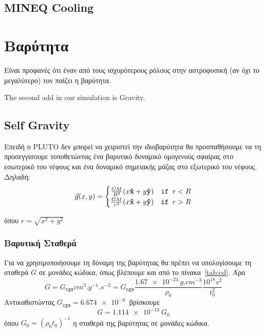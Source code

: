 \documentclass[article,a4paper,11.2pt]{memoir}
\numberwithin{equation}{subsection}
\begin{document}
	\subsection{MINEQ Cooling}
	
	\newpage
	\section{Βαρύτητα}
	Είναι προφανές ότι έναν από τους ισχυρότερους ρόλους στην αστροφυσική (αν όχι το μεγαλύτερο) τον παίζει η βαρύτητα. 
	
	
	
	
	The second add in our simulation is Gravity. 
	\subsection{Self Gravity}
	\label{par:SolidSphereSelfGravit}
	Επειδή ο PLUTO δεν μπορεί να χειριστεί την ιδιοβαρύτητα θα προσπαθήσουμε να τη προσεγγίσουμε τοποθετώντας ένα βαρυτικό δυναμικό ομογενούς σφαίρας στο εσωτερικό του νέφους και ένα δυναμικό σημειακής μάζας στο εξωτερικό του νέφους. Δηλαδή:
	\begin{equation}
		\vec{g}(x,y) = 
		\begin{cases}
			\frac{GM}{R^3}(x \vu x+ y \vu y) &\texttt{if } r<R \\
			\frac{GM}{r^3}(x \vu x+ y \vu y) &\texttt{if } r>R
		\end{cases}
	\end{equation}
	
	όπου $r=\sqrt{x^2+y^2}$
	
	\subsubsection{Βαρυτική Σταθερά}
	Για να χρησιμοποιήσουμε τη δύναμη της βαρύτητας θα πρέπει να υπολογίσουμε τη σταθερά $G$ σε μονάδες κώδικα, όπως βλέπουμε και από το πίνακα~\ref{tab:cd}. Άρα 
	\begin{equation}
		G=G_\texttt{cgs} \si{cm^3.g^{-1}.s^{-2}} = G_\texttt{cgs} \frac{\SI{1.67e-24}{g.cm^{-3}}}{\rho_0}\frac{10^{18}\si{s^2}}{t^2_0}
	\end{equation}
	Αντικαθιστώντας $G_\texttt{cgs}=\SI{6.674e-8}{}$ βρίσκουμε
	\begin{equation}
		\boxed{G=\SI{1.114e-13}{G_0}}
	\end{equation}
	όπου $G_0=(\rho_0 t_0)^{-1}$ η σταθερά της βαρύτητας σε μονάδες κώδικα.
	
\end{document}
